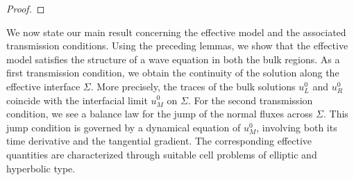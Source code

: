 \documentclass[11pt]{article}
\def\es{\varepsilon}
\def\omm{\Omega_M^\varepsilon}
\def\p{\partial}
\def\T{\mathcal{T}}
\newcommand{\di}[1]{\,\mathrm{d}#1}
\newcommand{\B}{\textcolor{orange}}
\begin{document}
\begin{proof}
\end{proof}

We now state our main result concerning the effective model and the associated transmission conditions. Using the preceding lemmas, we show that the effective model satisfies the structure of a wave equation in both the bulk regions. As a first transmission condition,  we obtain the continuity of the solution along the effective interface $\Sigma$. More precisely, the traces of the bulk solutions $u_L^0$ and $u_R^0$ coincide with the interfacial limit $u_M^0$ on $\Sigma$. For the second transmission condition, we see a balance law for the jump of the normal fluxes across $\Sigma$. This jump condition is governed by a dynamical equation of $u_M^0$, involving both its time derivative and the tangential gradient. The corresponding effective quantities are characterized through suitable cell problems of elliptic and hyperbolic type.
\end{document}
